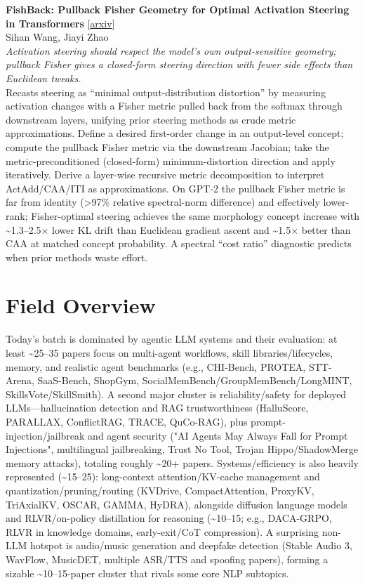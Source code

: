 \documentclass[12pt,letterpaper]{article}
\begin{document}
{\small\textbf{FishBack: Pullback Fisher Geometry for Optimal Activation Steering in Transformers}} {\scriptsize[\href{https://arxiv.org/abs/2605.17231}{arxiv}]}\\
{\scriptsize Sihan Wang, Jiayi Zhao}\\

{\small\textit{Activation steering should respect the model's own output-sensitive geometry; pullback Fisher gives a closed-form steering direction with fewer side effects than Euclidean tweaks.}}\\[1pt]
{\footnotesize Recasts steering as ``minimal output-distribution distortion'' by measuring activation changes with a Fisher metric pulled back from the softmax through downstream layers, unifying prior steering methods as crude metric approximations. Define a desired first-order change in an output-level concept; compute the pullback Fisher metric via the downstream Jacobian; take the metric-preconditioned (closed-form) minimum-distortion direction and apply iteratively. Derive a layer-wise recursive metric decomposition to interpret ActAdd/CAA/ITI as approximations. On GPT-2 the pullback Fisher metric is far from identity (>97\% relative spectral-norm difference) and effectively lower-rank; Fisher-optimal steering achieves the same morphology concept increase with \textasciitilde{}1.3--2.5× lower KL drift than Euclidean gradient ascent and \textasciitilde{}1.5× better than CAA at matched concept probability. A spectral ``cost ratio'' diagnostic predicts when prior methods waste effort.}

\medskip



\section*{Field Overview}
{\footnotesize Today's batch is dominated by agentic LLM systems and their evaluation: at least \textasciitilde{}25--35 papers focus on multi-agent workflows, skill libraries/lifecycles, memory, and realistic agent benchmarks (e.g., CHI-Bench, PROTEA, STT-Arena, SaaS-Bench, ShopGym, SocialMemBench/GroupMemBench/LongMINT, SkillsVote/SkillSmith). A second major cluster is reliability/safety for deployed LLMs---hallucination detection and RAG trustworthiness (HalluScore, PARALLAX, ConflictRAG, TRACE, QuCo-RAG), plus prompt-injection/jailbreak and agent security ("AI Agents May Always Fall for Prompt Injections", multilingual jailbreaking, Trust No Tool, Trojan Hippo/ShadowMerge memory attacks), totaling roughly \textasciitilde{}20+ papers. Systems/efficiency is also heavily represented (\textasciitilde{}15--25): long-context attention/KV-cache management and quantization/pruning/routing (KVDrive, CompactAttention, ProxyKV, TriAxialKV, OSCAR, GAMMA, HyDRA), alongside diffusion language models and RLVR/on-policy distillation for reasoning (\textasciitilde{}10--15; e.g., DACA-GRPO, RLVR in knowledge domains, early-exit/CoT compression). A surprising non-LLM hotspot is audio/music generation and deepfake detection (Stable Audio 3, WavFlow, MusicDET, multiple ASR/TTS and spoofing papers), forming a sizable \textasciitilde{}10--15-paper cluster that rivals some core NLP subtopics.}
\end{document}
